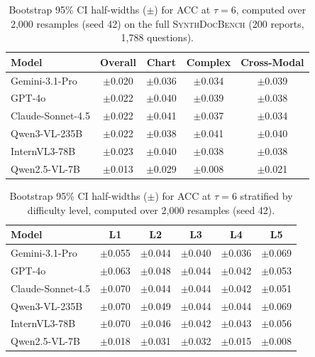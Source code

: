\documentclass{article} %
\begin{document}
\begin{table}[htbp]
\centering
\small
\caption{Bootstrap 95\% CI half-widths ($\pm$) for ACC at $\tau{=}6$, computed over 2{,}000 resamples (seed 42) on the full \textsc{SynthDocBench} (200 reports, 1{,}788 questions).}
\label{tab:bootstrap_ci}
\begin{tabular}{@{}lcccc@{}}
\toprule
\textbf{Model} & \textbf{Overall} & \textbf{Chart} & \textbf{Complex} & \textbf{Cross-Modal} \\
\midrule
Gemini-3.1-Pro    & $\pm$0.020 & $\pm$0.036 & $\pm$0.034 & $\pm$0.039 \\
GPT-4o            & $\pm$0.022 & $\pm$0.040 & $\pm$0.039 & $\pm$0.038 \\
Claude-Sonnet-4.5 & $\pm$0.022 & $\pm$0.041 & $\pm$0.037 & $\pm$0.034 \\
Qwen3-VL-235B     & $\pm$0.022 & $\pm$0.038 & $\pm$0.041 & $\pm$0.040 \\
InternVL3-78B     & $\pm$0.023 & $\pm$0.040 & $\pm$0.038 & $\pm$0.038 \\
Qwen2.5-VL-7B     & $\pm$0.013 & $\pm$0.029 & $\pm$0.008 & $\pm$0.021 \\
\bottomrule
\end{tabular}
\end{table}

\begin{table}[htbp]
\centering
\small
\caption{Bootstrap 95\% CI half-widths ($\pm$) for ACC at $\tau{=}6$ stratified by difficulty level, computed over 2{,}000 resamples (seed 42).}
\label{tab:bootstrap_ci_diff}
\begin{tabular}{@{}lccccc@{}}
\toprule
\textbf{Model} & \textbf{L1} & \textbf{L2} & \textbf{L3} & \textbf{L4} & \textbf{L5} \\
\midrule
Gemini-3.1-Pro    & $\pm$0.055 & $\pm$0.044 & $\pm$0.040 & $\pm$0.036 & $\pm$0.069 \\
GPT-4o            & $\pm$0.063 & $\pm$0.048 & $\pm$0.044 & $\pm$0.042 & $\pm$0.053 \\
Claude-Sonnet-4.5 & $\pm$0.070 & $\pm$0.044 & $\pm$0.044 & $\pm$0.042 & $\pm$0.051 \\
Qwen3-VL-235B     & $\pm$0.070 & $\pm$0.049 & $\pm$0.044 & $\pm$0.044 & $\pm$0.069 \\
InternVL3-78B     & $\pm$0.070 & $\pm$0.046 & $\pm$0.042 & $\pm$0.043 & $\pm$0.056 \\
Qwen2.5-VL-7B     & $\pm$0.018 & $\pm$0.031 & $\pm$0.032 & $\pm$0.015 & $\pm$0.008 \\
\bottomrule
\end{tabular}
\end{table}
\end{document}
